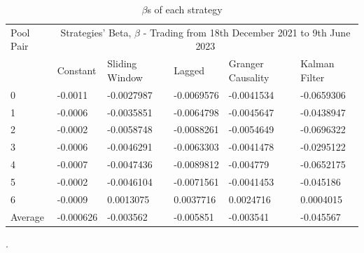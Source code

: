 \begin{table}[!htb]
    \centering
    \begin{adjustwidth}{-0.8in}{-0.9in}
        \begin{tabular}{|p{5em}|p{7em}|p{7em}|p{7em}|p{8em}|p{7em}|}\hline
            Pool Pair & \multicolumn{5}{|c|}{Strategies' Beta, $\beta$ - Trading from 18th December 2021 to 9th June 2023} \\\cline{1-6}
            & Constant & Sliding Window & Lagged & Granger Causality & Kalman Filter\\\cline{2-6}
            0 & -0.0011 & -0.0027987 & -0.0069576 & -0.0041534 & -0.0659306\\\cline{2-6}
            1 & -0.0006 & -0.0035851 & -0.0064798 & -0.0045647 & -0.0438947\\\cline{2-6}
            2 & -0.0002 & -0.0058748 & -0.0088261 & -0.0054649 & -0.0696322\\\cline{2-6}
            3 & -0.0006 & -0.0046291 & -0.0063303 & -0.0041478 & -0.0295122\\\cline{2-6}
            4 & -0.0007 & -0.0047436 & -0.0089812 & -0.004779 & -0.0652175\\\cline{2-6}
            5 & -0.0002 & -0.0046104 & -0.0071561 & -0.0041453 & -0.045186\\\cline{2-6}
            6 & -0.0009 & 0.0013075 & 0.0037716 & 0.0024716 & 0.0004015\\\hline\hline
            Average & -0.000626 & -0.003562 & -0.005851 & -0.003541 & -0.045567\\\hline
        \end{tabular}
    \end{adjustwidth}
    \caption{$\beta$s of each strategy \label{tab:betas}}.
\end{table}

